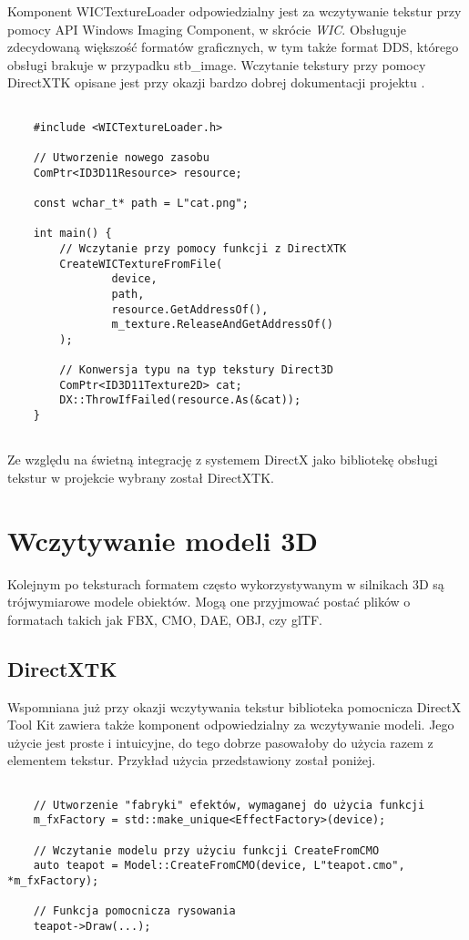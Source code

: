 Komponent WICTextureLoader odpowiedzialny jest za wczytywanie tekstur
przy pomocy API Windows Imaging Component, w skrócie \emph{WIC}. Obsługuje zdecydowaną większość formatów graficznych, w tym także format
DDS, którego obsługi brakuje w przypadku stb\_image. Wczytanie tekstury przy pomocy DirectXTK opisane jest przy okazji bardzo
dobrej dokumentacji projektu \cite{github:directxtk:sprites:2024}.

\begin{lstlisting}[caption={Przykład użycia DirectXTK WICTextureLoader (oryginalna treść)}, label={lst:directxtk_wic}]

	#include <WICTextureLoader.h>
	
	// Utworzenie nowego zasobu
	ComPtr<ID3D11Resource> resource;
	
	const wchar_t* path = L"cat.png";
	
	int main() {
		// Wczytanie przy pomocy funkcji z DirectXTK
		CreateWICTextureFromFile(
				device, 
				path, 
				resource.GetAddressOf(),
				m_texture.ReleaseAndGetAddressOf()
		);
		
		// Konwersja typu na typ tekstury Direct3D
		ComPtr<ID3D11Texture2D> cat;
		DX::ThrowIfFailed(resource.As(&cat));
	}
	
\end{lstlisting}

Ze względu na świetną integrację z systemem DirectX jako bibliotekę
obsługi tekstur w projekcie wybrany został DirectXTK.

\section{Wczytywanie modeli 3D}

Kolejnym po teksturach formatem często wykorzystywanym w silnikach 3D są
trójwymiarowe modele obiektów. Mogą one przyjmować postać plików o
formatach takich jak FBX, CMO, DAE, OBJ, czy glTF.

\subsection{DirectXTK}

Wspomniana już przy okazji wczytywania tekstur biblioteka pomocnicza
DirectX Tool Kit zawiera także komponent odpowiedzialny za wczytywanie
modeli. Jego użycie jest proste i intuicyjne, do tego dobrze pasowałoby
do użycia razem z elementem tekstur. Przykład użycia przedstawiony
został poniżej.

\begin{lstlisting}[caption={Przykład użycia DirectXTK Model (oryginalna treść)}, label={lst:directxtk_model}]
	
	// Utworzenie "fabryki" efektów, wymaganej do użycia funkcji
	m_fxFactory = std::make_unique<EffectFactory>(device);
	
	// Wczytanie modelu przy użyciu funkcji CreateFromCMO
	auto teapot = Model::CreateFromCMO(device, L"teapot.cmo", *m_fxFactory);
	
	// Funkcja pomocnicza rysowania
	teapot->Draw(...);
	
\end{lstlisting}

